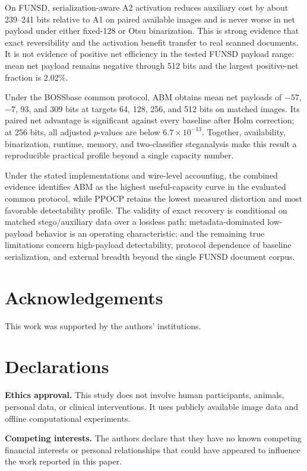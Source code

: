 \documentclass[a4paper,fleqn]{cas-dc}
\newcommand{\RevisionAddBegin}{\begingroup}
\newcommand{\RevisionAddEnd}{\endgroup}
\newcommand{\RevisionAddBegin}{\begingroup\color{revisionblue}}
\newcommand{\RevisionAddEnd}{\endgroup}
\begin{document}
On FUNSD, serialization-aware A2 activation reduces auxiliary cost by about
239--241 bits relative to A1 on paired available images and is never worse in
net payload under either fixed-128 or Otsu binarization. This is strong evidence
that exact reversibility and the activation benefit transfer to real scanned
documents. It is not evidence of positive net efficiency in the tested FUNSD
payload range: mean net payload remains negative through 512 bits and the
largest positive-net fraction is 2.02\%.

Under the BOSSbase common protocol, ABM obtains mean net payloads of $-57$,
$-7$, $93$, and $309$ bits at targets 64, 128, 256, and 512 bits on matched
images. Its paired net advantage is significant against every baseline after
Holm correction; at 256 bits, all adjusted $p$-values are below
$6.7\times10^{-13}$. Together, availability, binarization, runtime, memory,
and two-classifier steganalysis make this result a reproducible practical
profile beyond a single capacity number.

Under the stated implementations and wire-level accounting, the combined
evidence identifies ABM as the highest useful-capacity curve in the evaluated
common protocol, while PPOCP retains the lowest measured distortion and most
favorable detectability profile. The validity of exact recovery is conditional
on matched stego/auxiliary data over a lossless path; metadata-dominated
low-payload behavior is an operating characteristic; and the remaining true
limitations concern high-payload detectability, protocol dependence of baseline
serialization, and external breadth beyond the single FUNSD document corpus.

\RevisionAddEnd

\section*{Acknowledgements}
\RevisionAddBegin
This work was supported by the authors' institutions.
\RevisionAddEnd

\printcredits

\section*{Declarations}
\noindent\textbf{Ethics approval.}
This study does not involve human participants, animals, personal data, or
clinical interventions. It uses publicly available image data and offline
computational experiments.

\medskip
\noindent\textbf{Competing interests.}
The authors declare that they have no known competing financial interests or
\RevisionAddBegin
personal relationships that could have appeared to influence the work reported
in this paper.
\RevisionAddEnd
\end{document}
